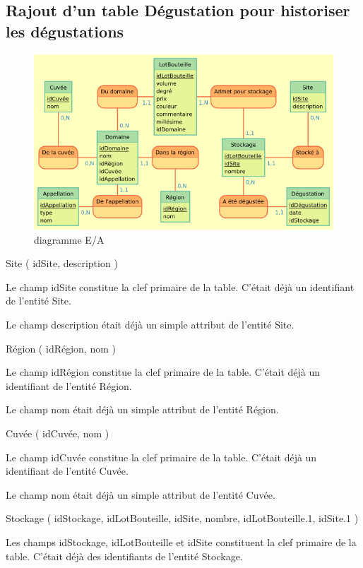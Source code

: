 \documentclass[11pt]{article}
\makeatletter
\def\maxwidth{\ifdim\Gin@nat@width>\linewidth\linewidth
    \else\Gin@nat@width\fi}
\let\Oldincludegraphics\includegraphics
\renewcommand{\includegraphics}[1]{\Oldincludegraphics[width=.8\maxwidth]{#1}}
\makeatother
\begin{document}
    \hypertarget{rajout-dun-table-duxe9gustation-pour-historiser-les-duxe9gustations}{%
\subsection{Rajout d'un table Dégustation pour historiser les
dégustations}\label{rajout-dun-table-duxe9gustation-pour-historiser-les-duxe9gustations}}

\begin{figure}
\centering
\includegraphics{mocodo/Stockages/Stockages.png}
\caption{diagramme E/A}
\end{figure}

{Site} ( {idSite}, {description} )

Le champ idSite constitue la clef primaire de la table. C'était déjà un
identifiant de l'entité Site.

Le champ description était déjà un simple attribut de l'entité Site.

{Région} ( {idRégion}, {nom} )

Le champ idRégion constitue la clef primaire de la table. C'était déjà
un identifiant de l'entité Région.

Le champ nom était déjà un simple attribut de l'entité Région.

{Cuvée} ( {idCuvée}, {nom} )

Le champ idCuvée constitue la clef primaire de la table. C'était déjà un
identifiant de l'entité Cuvée.

Le champ nom était déjà un simple attribut de l'entité Cuvée.

{Stockage} ( {idStockage}, {idLotBouteille}, {idSite}, {nombre},
{idLotBouteille.1}, {idSite.1} )

Les champs idStockage, idLotBouteille et idSite constituent la clef
primaire de la table. C'était déjà des identifiants de l'entité
Stockage.
\end{document}
